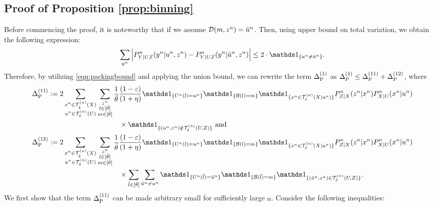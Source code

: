 \subsection{Proof of Proposition \ref{prop:binning}}
\label{app:proof:prop:binning}
Before commencing the proof, it is noteworthy that if we assume $\mathcal{D}(m,z^n) = \Tilde{u}^n$. Then, using upper bound on  total variation, we obtain the following expression:
\begin{equation}\label{eqn:packingbound}
    \sum_{\yn} \Big| P^n_{Y|UZ}(\yn|\un,\zn) - P^n_{Y|UZ}(\yn|\Tilde{u}^n,\zn)\Big| \leq 2 \cdot \I_{\set{\un \neq \Tilde{u}^n}}.
\end{equation}
Therefore, by utilizing \eqref{eqn:packingbound} and applying the union bound, we can rewrite the term $\Delta_{\text{P}}^{(1)}$ as $\Delta_{\text{P}}^{(1)} \leq \Delta_{\text{P}}^{(11)} + \Delta_{\text{P}}^{(12)}$, where 
\begin{align*}
    \peoneone &\deq 2 \sum_{\substack{\xn \in \Tx \\ \un \in \Tu }} \sum_{\substack{ \zn \\l \in [\btheta]\\m\in [\theta] }} 
    \frac{1}{\btheta} \frac{(1-\varepsilon)}{(1+\eta)} 
    \I_{\set{\Un(l) = \un}} \I_{\set{\calB(l) = m}} \I_{\set{\xn \in \Txcond}}
    P_{Z|X}^n(\zn|\xn) P_{X|U}^n(\xn|\un) \\
    &\hspace{100pt} \times\I_{\set{(\un,\zn) \notin \Tuz}} \eqand\\
    \peonetwo &\deq 2 \sum_{\substack{\xn \in \Tx \\ \un \in \Tu }}\sum_{\substack{ \zn \\ l \in [\btheta]\\m\in [\theta]}} 
    \frac{1}{\btheta} \frac{(1-\varepsilon)}{(1+\eta)} 
    \I_{\set{\Un(l) = \un}} \I_{\set{\calB(l) = m}} \I_{\set{\xn \in \Txcond}}
    P_{Z|X}^n(\zn|\xn) P_{X|U}^n(\xn|\un) \\
    &\hspace{100pt} \times \sum_{\ltilde \in [\btheta]} \sum_{\utilde^n \neq \un} \I_{\set{\Un(\ltilde) = \utilde^n}} \I_{\set{\calB(\ltilde) = m}} \I_{\set{(\utilde^n,\zn) \in \Tuz}}.
\end{align*}
We first show that the term $\Delta_{\text{P}}^{(11)}$ can be made arbitrary small for sufficiently large $n$. Consider the following inequalities:
